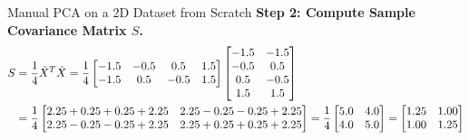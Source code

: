 \begin{examplebox}{Manual PCA on a 2D Dataset from Scratch}
\textbf{Step 2: Compute Sample Covariance Matrix $S$.}
\begin{align}
S &= \frac{1}{4} \tilde{X}^T \tilde{X} = \frac{1}{4} \begin{bmatrix} -1.5 & -0.5 & 0.5 & 1.5 \\ -1.5 & 0.5 & -0.5 & 1.5 \end{bmatrix} \begin{bmatrix} -1.5 & -1.5 \\ -0.5 & 0.5 \\ 0.5 & -0.5 \\ 1.5 & 1.5 \end{bmatrix} \notag \\
&= \frac{1}{4} \begin{bmatrix} 2.25 + 0.25 + 0.25 + 2.25 & 2.25 - 0.25 - 0.25 + 2.25 \\ 2.25 - 0.25 - 0.25 + 2.25 & 2.25 + 0.25 + 0.25 + 2.25 \end{bmatrix} = \frac{1}{4} \begin{bmatrix} 5.0 & 4.0 \\ 4.0 & 5.0 \end{bmatrix} = \begin{bmatrix} 1.25 & 1.00 \\ 1.00 & 1.25 \end{bmatrix}
\end{align}


\end{examplebox}
